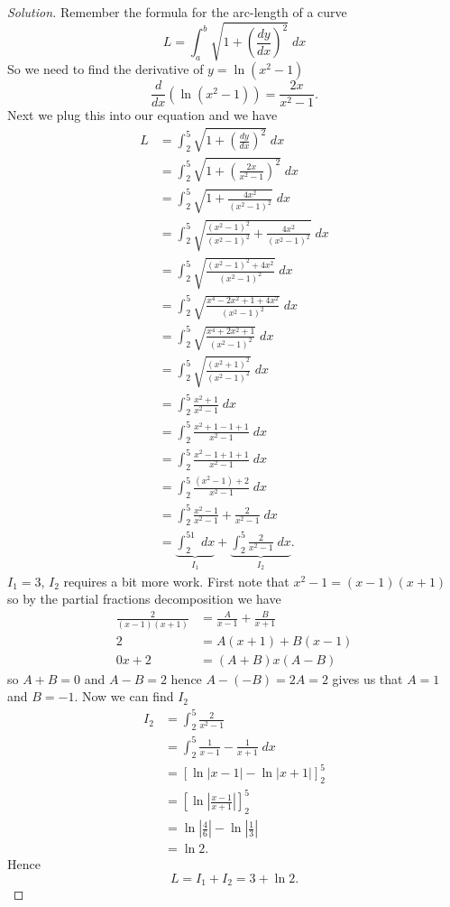 \begin{proof}[Solution]
Remember the formula for the arc-length of a curve
\begin{equation}
  \label{eq:arclength}
L=\int_a^b\sqrt{1+\left(\frac{dy}{dx}\right)^2}\;dx
\end{equation}
So we need to find the derivative of $y=\ln(x^2-1)$
\[
\frac{d}{dx}\left(\ln\left(x^2-1\right)\right)=\frac{2x}{x^2-1}.
\]
Next we plug this into our equation and we have
\begin{align*}
  L&=\int_2^5\sqrt{1+\left(\frac{dy}{dx}\right)^2}\;dx\\
   &=\int_2^5\sqrt{1+\left(\frac{2x}{x^2-1}\right)^2}\;dx\\
   &=\int_2^5\sqrt{1+\frac{4x^2}{\left(x^2-1\right)^2}}\;dx\\
   &=\int_2^5\sqrt{\frac{\left(x^2-1\right)^2}{\left(x^2-1\right)^2}
     +\frac{4x^2}{\left(x^2-1\right)^2}}\;dx\\
   &=\int_2^5\sqrt{\frac{\left(x^2-1\right)^2+4x^2}{\left(x^2-1\right)^2}}\;dx\\
   &=\int_2^5\sqrt{\frac{x^4-2x^2+1+4x^2}{\left(x^2-1\right)^2}}\;dx\\
   &=\int_2^5\sqrt{\frac{x^4+2x^2+1}{\left(x^2-1\right)^2}}\;dx\\
   &=\int_2^5\sqrt{\frac{\left(x^2+1\right)^2}{\left(x^2-1\right)^2}}\;dx\\
   &=\int_2^5\frac{x^2+1}{x^2-1}\;dx\\
   &=\int_2^5\frac{x^2+1-1+1}{x^2-1}\;dx\\
   &=\int_2^5\frac{x^2-1+1+1}{x^2-1}\;dx\\
   &=\int_2^5\frac{\left(x^2-1\right)+2}{x^2-1}\;dx\\
   &=\int_2^5\frac{x^2-1}{x^2-1}+\frac{2}{x^2-1}\;dx\\
   &=\underbrace{\int_2^51\;dx}_{I_1}+\underbrace{\int_2^5\frac{2}{x^2-1}\;dx}_{I_2}.
\end{align*}
$I_1=3$, $I_2$ requires a bit more work. First note that $x^2-1=(x-1)(x+1)$
so by the partial fractions decomposition we have
\begin{align*}
\frac{2}{(x-1)(x+1)}&=\frac{A}{x-1}+\frac{B}{x+1}\\
  2&=A(x+1)+B(x-1)\\
  0x+2&=(A+B)x(A-B)
\end{align*}
so $A+B=0$ and $A-B=2$ hence $A-(-B)=2A=2$ gives us that $A=1$ and
$B=-1$. Now we can find $I_2$
\begin{align*}
I_2&=\int_2^5\frac{2}{x^2-1}\\
   &=\int_2^5 \frac{1}{x-1}-\frac{1}{x+1}\;dx\\
   &=\left[\ln|x-1|-\ln|x+1|\right]_2^5\\
   &=\left[\ln\left|\frac{x-1}{x+1}\right|\right]_2^5\\
   &=\ln\left|\frac{4}{6}\right|-\ln\left|\frac{1}{3}\right|\\
   &=\ln 2.
\end{align*}
Hence
\[
L=I_1+I_2=\boxed{3+\ln 2.}
\]
\end{proof}

